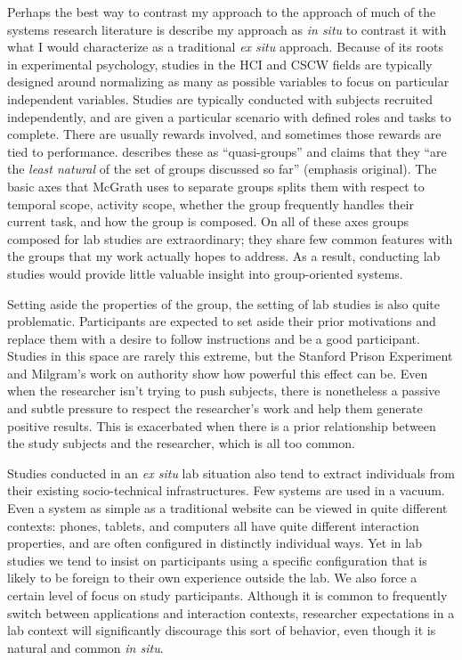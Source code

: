 Perhaps the best way to contrast my approach to the approach of much of the systems research literature is describe my approach as \emph{in situ} to contrast it with what I would characterize as a traditional \emph{ex situ} approach. Because of its roots in experimental psychology, studies in the HCI and CSCW fields are typically designed around normalizing as many as possible variables to focus on particular independent variables. Studies are typically conducted with subjects recruited independently, and are given a particular scenario with defined roles and tasks to complete. There are usually rewards involved, and sometimes those rewards are tied to performance. \citet{McGrath:1984un} describes these as ``quasi-groups'' and claims that they ``are the \emph{least natural} of the set of groups discussed so far'' (emphasis original). The basic axes that McGrath uses to separate groups splits them with respect to temporal scope, activity scope, whether the group frequently handles their current task, and how the group is composed. On all of these axes groups composed for lab studies are extraordinary; they share few common features with the groups that my work actually hopes to address. As a result, conducting lab studies would provide little valuable insight into group-oriented systems.


Setting aside the properties of the group, the setting of lab studies is also quite problematic. Participants are expected to set aside their prior motivations and replace them with a desire to follow instructions and be a good participant. Studies in this space are rarely this extreme, but the Stanford Prison Experiment \citep{Haney:1973wf} and Milgram's work on authority \citep{Milgram:1983vh} show how powerful this effect can be. Even when the researcher isn't trying to push subjects, there is nonetheless a passive and subtle pressure to respect the researcher's work and help them generate positive results. This is exacerbated when there is a prior relationship between the study subjects and the researcher, which is all too common. 

Studies conducted in an \emph{ex situ} lab situation also tend to extract individuals from their existing socio-technical infrastructures. Few systems are used in a vacuum. Even a system as simple as a traditional website can be viewed in quite different contexts: phones, tablets, and computers all have quite different interaction properties, and are often configured in distinctly individual ways. Yet in lab studies we tend to insist on participants using a specific configuration that is likely to be foreign to their own experience outside the lab. We also force a certain level of focus on study participants. Although it is common to frequently switch between applications and interaction contexts, researcher expectations in a lab context will significantly discourage this sort of behavior, even though it is natural and common \emph{in situ}. 

